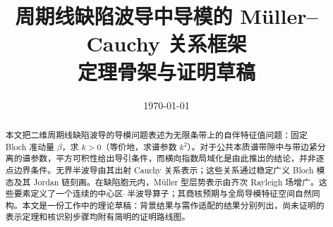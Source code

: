 \documentclass[11pt,UTF8,fontset=fandol]{ctexart}
\title{周期线缺陷波导中导模的 M\"uller--Cauchy 关系框架\\
\large 定理骨架与证明草稿}
\author{}
\date{\today}
\theoremstyle{definition}
\theoremstyle{remark}
\begin{document}
\maketitle

\begin{abstract}
本文把二维周期线缺陷波导的导模问题表述为无限条带上的自伴特征值问题：固定 Bloch 准动量 $\beta$，求 $k>0$（等价地，求谱参数 $k^2$）。对于公共本质谱带隙中与带边紧分离的谱参数，平方可积性给出导引条件，而横向指数局域化是由此推出的结论，并非逐点边界条件。无界半波导由其出射 Cauchy 关系表示；这些关系通过稳定广义 Bloch 模态及其 Jordan 链刻画。在缺陷胞元内，M\"uller 型层势表示由齐次 Rayleigh 场增广。这些要素定义了一个连续的中心区--半波导算子；其商核预期与全局导模特征空间自然同构。本文是一份工作中的理论草稿：背景结果与需作适配的结果分别列出，尚未证明的表示定理和核识别步骤均附有简明的证明路线图。
\end{abstract}






\appendix




\printbibliography
\end{document}
